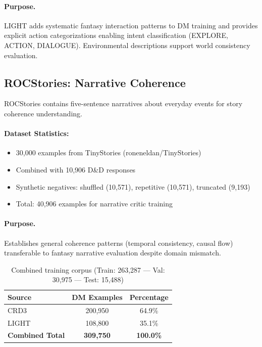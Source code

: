 \documentclass[11pt]{article}
\begin{document}
\paragraph{Purpose.} LIGHT adds systematic fantasy interaction patterns to DM training and provides explicit action categorizations enabling intent classification (EXPLORE, ACTION, DIALOGUE). Environmental descriptions support world consistency evaluation.

\subsection{ROCStories: Narrative Coherence}

ROCStories \cite{mostafazadeh2016corpus} contains five-sentence narratives about everyday events for story coherence understanding.

\paragraph{Dataset Statistics:}
\begin{itemize}
\item 30,000 examples from TinyStories (roneneldan/TinyStories)
\item Combined with 10,906 D\&D responses
\item Synthetic negatives: shuffled (10,571), repetitive (10,571), truncated (9,193)
\item Total: 40,906 examples for narrative critic training
\end{itemize}

\paragraph{Purpose.} Establishes general coherence patterns (temporal consistency, causal flow) transferable to fantasy narrative evaluation despite domain mismatch.

\begin{table}[h]
\centering
\begin{tabular}{lcc}
\toprule
\textbf{Source} & \textbf{DM Examples} & \textbf{Percentage} \\
\midrule
CRD3 & 200,950 & 64.9\% \\
LIGHT & 108,800 & 35.1\% \\
\midrule
\textbf{Combined Total} & \textbf{309,750} & \textbf{100.0\%} \\
\bottomrule
\end{tabular}
\caption{Combined training corpus (Train: 263,287 — Val: 30,975 — Test: 15,488)}
\end{table}
\end{document}

